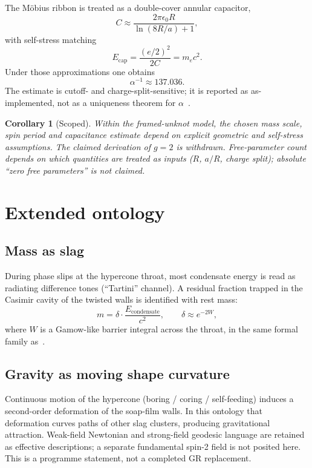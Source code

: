 \documentclass[11pt,a4paper]{article}
\newtheorem{corollary}{Corollary}[section]
\theoremstyle{definition}
\theoremstyle{remark}
\begin{document}
The M\"obius ribbon is treated as a double-cover annular capacitor,
\begin{equation}
C \approx \frac{2\pi\epsilon_0 R}{\ln(8R/a)+1},
\end{equation}
with self-stress matching
\begin{equation}
E_{\mathrm{cap}} = \frac{(e/2)^2}{2C} = m_e c^2.
\end{equation}
Under those approximations one obtains
\begin{equation}
\alpha^{-1}\approx 137.036.
\end{equation}
The estimate is cutoff- and charge-split-sensitive; it is reported as
as-implemented, not as a uniqueness theorem for $\alpha$~\cite{Mobius2026}.

\begin{corollary}[Scoped]
Within the framed-unknot model, the chosen mass scale, spin period and
capacitance estimate depend on explicit geometric and self-stress
assumptions. The claimed derivation of $g=2$ is withdrawn.  Free-parameter count depends on which
quantities are treated as inputs ($R$, $a/R$, charge split); absolute
``zero free parameters'' is not claimed.
\end{corollary}

\section{Extended ontology}
\label{sec:ontology}

\subsection{Mass as slag}

During phase slips at the hypercone throat, most condensate energy is
read as radiating difference tones (``Tartini'' channel).  A residual
fraction trapped in the Casimir cavity of the twisted walls is
identified with rest mass:
\begin{equation}
m = \delta\cdot\frac{E_{\mathrm{condensate}}}{c^2},
\qquad
\delta\approx e^{-2W},
\end{equation}
where $W$ is a Gamow-like barrier integral across the throat, in the
same formal family as~\cite{FlagDecay2026}.

\subsection{Gravity as moving shape curvature}

Continuous motion of the hypercone (boring / coring / self-feeding)
induces a second-order deformation of the soap-film walls.  In this
ontology that deformation curves paths of other slag clusters, producing
gravitational attraction.  Weak-field Newtonian and strong-field geodesic
language are retained as effective descriptions; a separate fundamental
spin-2 field is not posited here.  This is a programme statement, not a
completed GR replacement.
\end{document}
